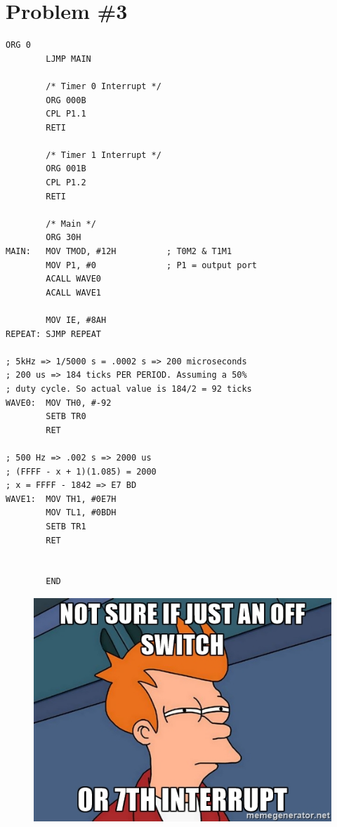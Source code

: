 \documentclass[12pt]{article}
\begin{document}
\section{Problem \#3}
\begin{lstlisting}[style=cASM]
        ORG 0
        LJMP MAIN

        /* Timer 0 Interrupt */
        ORG 000B
        CPL P1.1
        RETI

        /* Timer 1 Interrupt */
        ORG 001B
        CPL P1.2
        RETI

        /* Main */
        ORG 30H
MAIN:   MOV TMOD, #12H          ; T0M2 & T1M1
        MOV P1, #0              ; P1 = output port
        ACALL WAVE0
        ACALL WAVE1

        MOV IE, #8AH
REPEAT: SJMP REPEAT

; 5kHz => 1/5000 s = .0002 s => 200 microseconds
; 200 us => 184 ticks PER PERIOD. Assuming a 50%
; duty cycle. So actual value is 184/2 = 92 ticks
WAVE0:  MOV TH0, #-92
        SETB TR0
        RET

; 500 Hz => .002 s => 2000 us
; (FFFF - x + 1)(1.085) = 2000
; x = FFFF - 1842 => E7 BD
WAVE1:  MOV TH1, #0E7H
        MOV TL1, #0BDH
        SETB TR1
        RET


        END
\end{lstlisting}
\begin{figure}[!ht]
    \centering
    \includegraphics{meme2.jpg}
\end{figure}
\end{document}
